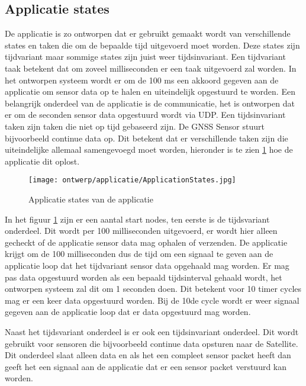 \subsection{Applicatie states}
De applicatie is zo ontworpen dat er gebruikt gemaakt wordt van verschillende states en taken die om de bepaalde tijd uitgevoerd moet worden. Deze states zijn tijdvariant maar sommige states zijn juist weer tijdsinvariant. Een tijdvariant taak  betekent dat om zoveel milliseconden er een taak uitgevoerd zal worden. In het ontworpen systeem wordt er om de 100 ms een akkoord gegeven aan de applicatie om sensor data op te halen en uiteindelijk opgestuurd te worden. Een belangrijk onderdeel van de applicatie is de communicatie, het is ontworpen dat er om de seconden sensor data opgestuurd wordt via UDP. Een tijdsinvariant taken zijn taken die niet op tijd gebaseerd zijn. De GNSS Sensor stuurt bijvoorbeeld continue data op. Dit betekent dat er verschillende taken zijn die uiteindelijke allemaal samengevoegd moet worden, hieronder is te zien \ref{fig:appstates} hoe de applicatie dit oplost. \newline

\begin{figure}[h!]
	\centering
	\label{fig:appstates}

	\texttt{[image: ontwerp/applicatie/ApplicationStates.jpg]}
	\caption{Applicatie states van de applicatie}
\end{figure}

\noindent In het figuur \ref{fig:appstates} zijn er een aantal start nodes, ten eerste is de tijdsvariant onderdeel. Dit wordt per 100 milliseconden uitgevoerd, er wordt hier alleen gecheckt of de applicatie sensor data mag ophalen of verzenden. De applicatie krijgt om de 100 milliseconden dus de tijd om een signaal te geven aan de applicatie loop dat het tijdvariant sensor data opgehaald mag worden. Er mag pas data opgestuurd worden als een bepaald tijdsinterval gehaald wordt, het ontworpen systeem zal dit om 1 seconden doen. Dit betekent voor 10 timer cycles mag er een keer data opgestuurd worden. Bij de 10de cycle wordt er weer signaal gegeven aan de applicatie loop dat er data opgestuurd mag worden. \newline

\noindent Naast het tijdsvariant onderdeel is er ook een tijdsinvariant onderdeel. Dit wordt gebruikt voor sensoren die bijvoorbeeld continue data opsturen naar de Satellite. Dit onderdeel slaat alleen data en als het een compleet sensor packet heeft dan geeft het een signaal aan de applicatie dat er een sensor packet verstuurd kan worden. \newline

